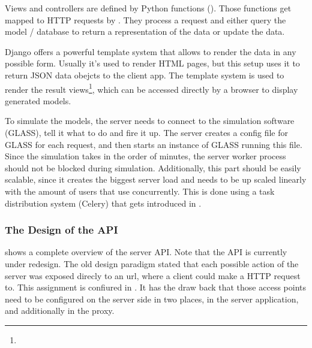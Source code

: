 Views and controllers are defined by Python functions ().
Those functions get mapped to HTTP requests by .
They process a request and either query the model / database to return a representation of the data or update the data.



Django offers a powerful template system that allows to render the data in any possible form.
Usually it's used to render HTML pages, but this setup uses it to return JSON data obejcts to the client app.
The template system is used to render the result views\footnote{}, which can be accessed directly by a browser to display generated models.

To simulate the models, the server needs to connect to the simulation software (GLASS), tell it what to do and fire it up.
The server creates a config file for GLASS for each request, and then starts an instance of GLASS running this file.
Since the simulation takes in the order of minutes, the server worker process should not be blocked during simulation.
Additionally, this part should be easily scalable, since it creates the biggest server load and needs to be up scaled linearly with the amount of users that use \spl concurrently.
This is done using a task distribution system (Celery) that gets introduced in .







\subsubsection{The Design of the API}





 shows a complete overview of the server API.
Note that the API is currently under redesign.
The old design paradigm stated that each possible action of the server was exposed direcly to an url, where a client could make a HTTP request to. This assignment is confiured in .
It has the draw back that those access points need to be configured on the server side in two places, in the server application, and additionally in the proxy.

